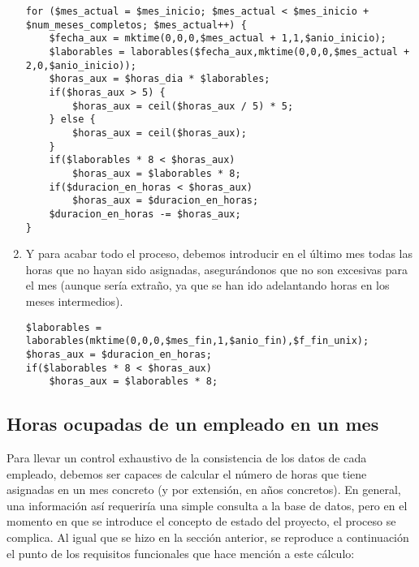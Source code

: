\begin{enumerate}
\begin{lstlisting}
for ($mes_actual = $mes_inicio; $mes_actual < $mes_inicio +
$num_meses_completos; $mes_actual++) {
	$fecha_aux = mktime(0,0,0,$mes_actual + 1,1,$anio_inicio);
	$laborables = laborables($fecha_aux,mktime(0,0,0,$mes_actual +
2,0,$anio_inicio));
	$horas_aux = $horas_dia * $laborables;
	if($horas_aux > 5) {
		$horas_aux = ceil($horas_aux / 5) * 5;
	} else {
		$horas_aux = ceil($horas_aux);
	}
	if($laborables * 8 < $horas_aux)
		$horas_aux = $laborables * 8;
	if($duracion_en_horas < $horas_aux)
		$horas_aux = $duracion_en_horas;
	$duracion_en_horas -= $horas_aux;
}
\end{lstlisting}

\item Y para acabar todo el proceso, debemos introducir en el último mes todas
las horas que no hayan sido asignadas, asegurándonos que no son excesivas para
el mes (aunque sería extraño, ya que se han ido adelantando horas en los meses
intermedios).

\begin{lstlisting}
$laborables = laborables(mktime(0,0,0,$mes_fin,1,$anio_fin),$f_fin_unix);
$horas_aux = $duracion_en_horas;
if($laborables * 8 < $horas_aux)
	$horas_aux = $laborables * 8;
\end{lstlisting}

\end{enumerate}

\subsection{Horas ocupadas de un empleado en un mes}

Para llevar un control exhaustivo de la consistencia de los datos de cada
empleado, debemos ser capaces de calcular el número de horas que tiene asignadas
en un mes concreto (y por extensión, en años concretos). En general, una
información así requeriría una simple consulta a la base de datos, pero en el
momento en que se introduce el concepto de estado del proyecto, el proceso se
complica. Al igual que se hizo en la sección anterior, se reproduce a
continuación el punto de los requisitos funcionales que hace mención a este
cálculo:


